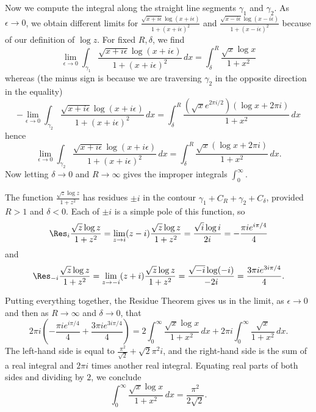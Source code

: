 \documentclass[11pt]{book}
\theoremstyle{definition}
\begin{document}
\begin{enumerate}
        
        Now we compute the integral along the straight line segments $\gamma_1$ and $\gamma_2$.  As $\epsilon \to 0$, we obtain different limits for $\frac{\sqrt{x+ i\epsilon} \log(x+i\epsilon)}{1+(x+i\epsilon)^2}$ and $\frac{\sqrt{x- i\epsilon} \log(x-i\epsilon)}{1+(x-i\epsilon)^2}$ because of our definition of $\log z$.  For fixed $R,\delta$, we find 
        \[ \lim_{\epsilon \to 0} \int_{\gamma_1} \frac{\sqrt{x+i\epsilon}\log (x+i\epsilon) }{1 + (x+i\epsilon)^2} \, dx = \int_\delta^R \frac{\sqrt x \log x}{ 1+ x^2 }   \]
          whereas  (the minus sign is because we are traversing $\gamma_2$ in the opposite direction in the equality)
          \[ -  \lim_{\epsilon\to 0} \int_{\gamma_2} \frac{\sqrt{x+i\epsilon} \log(x+i\epsilon)}{1 + (x+i\epsilon)^2} \, dx = \int_\delta^R \frac{(\sqrt{x} e^{2\pi i / 2}) (\log x + 2\pi i)}{1 + x^2} \, dx   \] 
          hence
          \[ \lim_{\epsilon\to 0} \int_{\gamma_2} \frac{\sqrt{x+i\epsilon} \log(x+i\epsilon)}{1 + (x+i\epsilon)^2} \, dx = \int_\delta^R \frac{\sqrt{x} (\log x + 2\pi i)}{1 + x^2} \, dx . \]   
          Now letting $\delta\to 0$ and $R \to \infty$ gives the improper integrals $\int_0^\infty$. %

          The function $\frac{\sqrt z \log z}{1 +z^2}$ has residues $\pm i$ in the contour $\gamma_1 + C_R + \gamma_2 + C_\delta$, provided $R>1$ and $\delta<0$.   Each of $\pm i$ is a simple pole of this function, so 
          \[ \Res_i \frac{\sqrt z \log z}{1 +z^2} = \lim_{z\to i} (z-i) \frac{\sqrt z \log z}{1 +z^2} = \frac{\sqrt i \log i}{2i} = - \frac{\pi i e^{i\pi/4}}{4} \] and 
          \[ \Res_{-i} \frac{\sqrt z \log z}{1 +z^2} = \lim_{z\to -i} (z+i) \frac{\sqrt z \log z}{1 +z^2} = \frac{\sqrt{-i}\log(-i)}{-2i} =  \frac{3\pi i e^{3i\pi/4}}{4}.  \] 

          Putting everything together, the Residue Theorem gives us in the limit, as $\epsilon \to 0$ and then as $R\to \infty$ and $\delta\to 0$,  that
          \[ 2\pi i \left( - \frac{\pi i e^{i\pi/4}}{4} + \frac{3\pi i e^{3i\pi/4}}{4} \right) = 2 \int_0^\infty \frac{\sqrt x \log x}{1+x^2} \, dx + 2\pi i \int_0^\infty   \frac{\sqrt x}{1 + x^2} \, dx.  \] 
          The left-hand side is equal to $\frac{\pi^2}{\sqrt 2} + \sqrt 2 \pi^2 i$, and the right-hand side is the sum of a real integral and $2\pi i$ times another real integral.   Equating real parts of both sides and dividing by $2$, we conclude
          \[ \int_0^\infty \frac{\sqrt x \log x}{1+x^2} \, dx = \frac{\pi^2}{2\sqrt 2}. \] 
           


\end{enumerate}
\end{document}
